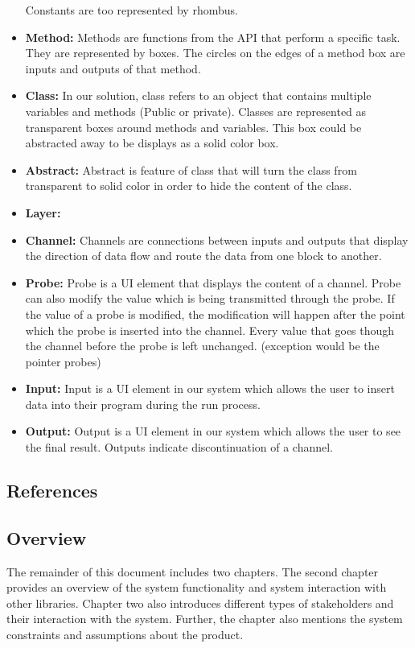 \documentclass[journal,10pt,onecolumn,compsoc]{IEEEtran} \usepackage[margin=1.0in]{geometry} \usepackage{pdfpages} \usepackage{graphicx}
\begin{document}
\begin{itemize}
		Constants are too represented by rhombus.
	\item \textbf{Method:}
		Methods are functions from the API that perform a specific task. They are represented by boxes.
		The circles on the edges of a method box are inputs and outputs of that method.
	\item \textbf{Class:} 
		In our solution, class refers to an object that contains multiple variables and methods (Public or private).
		Classes are represented as transparent boxes around methods and variables. This box could be abstracted away to be displays as a solid color box.
	\item \textbf{Abstract:}
		Abstract is feature of class that will turn the class from transparent to solid color in order to hide the content of the class.
	\item \textbf{Layer:} 
	\item \textbf{Channel:}
		 Channels are connections between inputs and outputs that display the direction of data flow and route the data from one block to another. 
	\item \textbf{Probe:}
		Probe is a UI element that displays the content of a channel.
		Probe can also modify the value which is being transmitted through the probe.
		If the value of a probe is modified, the modification will happen after the point which the probe is inserted into the channel.
		Every value that goes though the channel before the probe is left unchanged. (exception would be the pointer probes)
	\item \textbf{Input:}
		Input is a UI element in our system which allows the user to insert data into their program during the run process.
	\item \textbf{Output:}
		Output is a UI element in our system which allows the user to see the final result. Outputs indicate discontinuation of a channel.
\end{itemize}
\subsection{References}
\subsection{Overview}

The remainder of this document includes two chapters. 
The second chapter provides an overview of the system functionality and system interaction with other libraries. 
Chapter two also introduces different types of stakeholders and their interaction with the system. 
Further, the chapter also mentions the system constraints and assumptions about the product.
\end{document}
